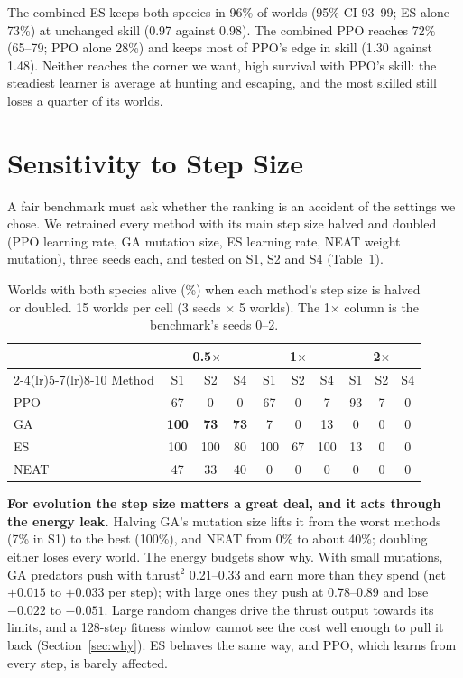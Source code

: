 \documentclass[conference]{IEEEtran}
\begin{document}
The combined ES keeps both species in 96\% of worlds (95\% CI 93--99; ES alone 73\%) at unchanged skill (0.97 against 0.98). The combined PPO reaches 72\% (65--79; PPO alone 28\%) and keeps most of PPO's edge in skill (1.30 against 1.48). Neither reaches the corner we want, high survival with PPO's skill: the steadiest learner is average at hunting and escaping, and the most skilled still loses a quarter of its worlds.

\section{Sensitivity to Step Size}
\label{sec:hyper}
A fair benchmark must ask whether the ranking is an accident of the settings we chose. We retrained every method with its main step size halved and doubled (PPO learning rate, GA mutation size, ES learning rate, NEAT weight mutation), three seeds each, and tested on S1, S2 and S4 (Table~\ref{tab:hyper}).

\begin{table}[t]
\centering
\caption{Worlds with both species alive (\%) when each method's step size is halved or doubled. 15 worlds per cell (3 seeds $\times$ 5 worlds). The 1$\times$ column is the benchmark's seeds 0--2.}
\label{tab:hyper}
\setlength{\tabcolsep}{4pt}
\begin{tabular}{lccccccccc}
\toprule
 & \multicolumn{3}{c}{0.5$\times$} & \multicolumn{3}{c}{1$\times$} & \multicolumn{3}{c}{2$\times$} \\
\cmidrule(lr){2-4}\cmidrule(lr){5-7}\cmidrule(lr){8-10}
Method & S1 & S2 & S4 & S1 & S2 & S4 & S1 & S2 & S4 \\
\midrule
PPO & 67 & 0 & 0 & 67 & 0 & 7 & 93 & 7 & 0 \\
GA & \textbf{100} & \textbf{73} & \textbf{73} & 7 & 0 & 13 & 0 & 0 & 0 \\
ES & 100 & 100 & 80 & 100 & 67 & 100 & 13 & 0 & 0 \\
NEAT & 47 & 33 & 40 & 0 & 0 & 0 & 0 & 0 & 0 \\
\bottomrule
\end{tabular}
\end{table}

\textbf{For evolution the step size matters a great deal, and it acts through the energy leak.} Halving GA's mutation size lifts it from the worst methods (7\% in S1) to the best (100\%), and NEAT from 0\% to about 40\%; doubling either loses every world. The energy budgets show why. With small mutations, GA predators push with thrust$^2$ 0.21--0.33 and earn more than they spend (net $+0.015$ to $+0.033$ per step); with large ones they push at 0.78--0.89 and lose $-0.022$ to $-0.051$. Large random changes drive the thrust output towards its limits, and a 128-step fitness window cannot see the cost well enough to pull it back (Section~\ref{sec:why}). ES behaves the same way, and PPO, which learns from every step, is barely affected.
\end{document}
